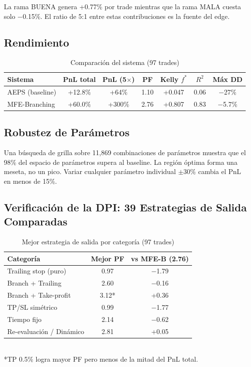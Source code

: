 \documentclass[11pt,a4paper]{article}
\begin{document}
La rama BUENA genera +0.77\% por trade mientras que la rama MALA cuesta solo $-$0.15\%. El ratio de 5:1 entre estas contribuciones es la fuente del edge.

\subsection{Rendimiento}

\begin{table}[H]
\centering
\caption{Comparación del sistema (97 trades)}
\begin{tabular}{lcccccc}
\toprule
Sistema & PnL total & PnL (5$\times$) & PF & Kelly $f^*$ & $R^2$ & Máx DD \\
\midrule
AEPS (baseline) & +12.8\% & +64\% & 1.10 & +0.047 & 0.06 & $-$27\% \\
MFE-Branching & +60.0\% & +300\% & 2.76 & +0.807 & 0.83 & $-$5.7\% \\
\bottomrule
\end{tabular}
\end{table}

\subsection{Robustez de Parámetros}

Una búsqueda de grilla sobre 11,869 combinaciones de parámetros muestra que el 98\% del espacio de parámetros supera al baseline. La región óptima forma una meseta, no un pico. Variar cualquier parámetro individual $\pm$30\% cambia el PnL en menos de 15\%.

\subsection{Verificación de la DPI: 39 Estrategias de Salida Comparadas}

\begin{table}[H]
\centering
\caption{Mejor estrategia de salida por categoría (97 trades)}
\begin{tabular}{lcc}
\toprule
Categoría & Mejor PF & vs MFE-B (2.76) \\
\midrule
Trailing stop (puro) & 0.97 & $-$1.79 \\
Branch + Trailing & 2.60 & $-$0.16 \\
Branch + Take-profit & 3.12* & +0.36 \\
TP/SL simétrico & 0.99 & $-$1.77 \\
Tiempo fijo & 2.14 & $-$0.62 \\
Re-evaluación / Dinámico & 2.81 & +0.05 \\
\bottomrule
\end{tabular}\\
\small{*TP 0.5\% logra mayor PF pero menos de la mitad del PnL total.}
\end{table}
\end{document}
